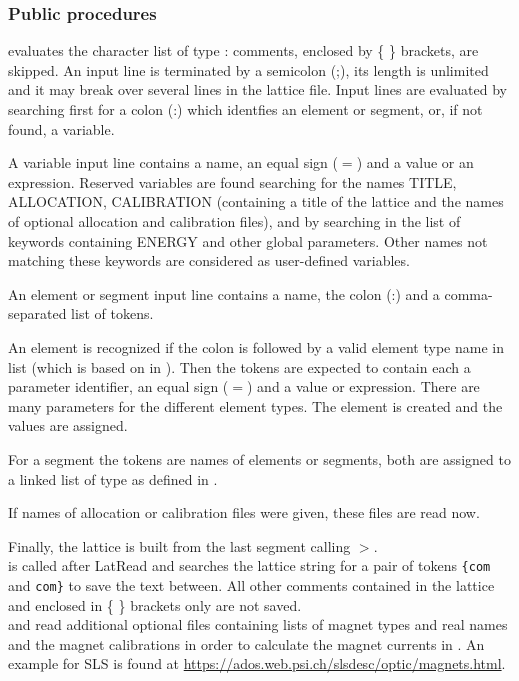 \documentclass[12pt]{article}
\newcommand\code[1]{{\tt #1}}
\newcommand\guico[1]{{\color{blue}\code{#1}}}
\newcommand{\unico}[1]{{\color{burntorange}\code{#1}}}
\newcommand{\prcod}[2]{\opauni{#1}$>$\unico{#2}}
\newcommand{\opauni}[1]{\colorbox{orange!30}{{\color{black}\code{#1}}}}
\newcommand{\ouni}[1]{\hyperref[#1]{\opauni{#1}}}
\newcommand{\ppro}[1]{\subsubsection*{Public procedures} #1}
\begin{document}
\ppro{
\unico{Latread} evaluates the character list of type \unico{TextBuffer}: comments, enclosed by \{ \} brackets, are skipped. An input line is terminated by a semicolon (;), its length is unlimited and it may break over several lines in the lattice file.  Input lines are evaluated by searching first for a colon (:) which identfies an element or segment, or, if not found, a variable.

A variable input line contains a name, an equal sign ($=$) and a value or an expression.
Reserved variables are found searching for the names TITLE, ALLOCATION, CALIBRATION (containing a title of the lattice and the names of optional allocation and calibration files), and by searching in the list of keywords \unico{globkeyw} containing ENERGY and other global parameters. Other names not matching these keywords are considered as user-defined variables.

An element or segment input line contains a name, the colon (:) and a comma-separated list of tokens.

An element is recognized if the colon is followed by a valid element type name in list \unico{elemkeyw} (which is based on \unico{ElemName} in \ouni{globlib}). Then the tokens are expected to contain each a parameter identifier, an equal sign ($=$) and a value or expression. There are many parameters for the different element types. The element is created and the values are assigned.

For a segment the tokens are names of elements or segments, both are  assigned to a linked list of type \unico{AbstractEleType} as defined in \ouni{globlib}.

If names of allocation or calibration files were given, these files are read now.

Finally, the lattice is built from the last segment calling \prcod{editlib}{MakeLattice}.\\


\unico{LatReadCom} is called after LatRead and searches the lattice string for a pair of tokens \code{\{com} and \code{com\}} to save the text between. All other comments contained in the lattice and enclosed in \{ \} brackets only are not saved.\\

\unico{ReadAllocation} and \unico{ReadCalibration} read additional optional files containing lists of magnet types and real names and the magnet calibrations in order to calculate the magnet currents in \guico{opacurrents}. 
An example for SLS is found at \url{https://ados.web.psi.ch/slsdesc/optic/magnets.html}. 

}
\end{document}
